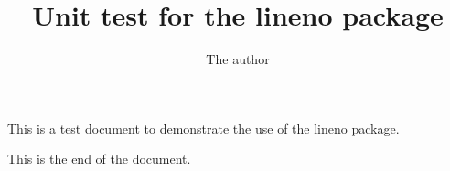 \documentclass{article}
\title{Unit test for the lineno package}
\author{The author}
\begin{document}
\maketitle

This is a test document to demonstrate the use of the lineno package.

\lipsum

This is the end of the document.
\end{document}
